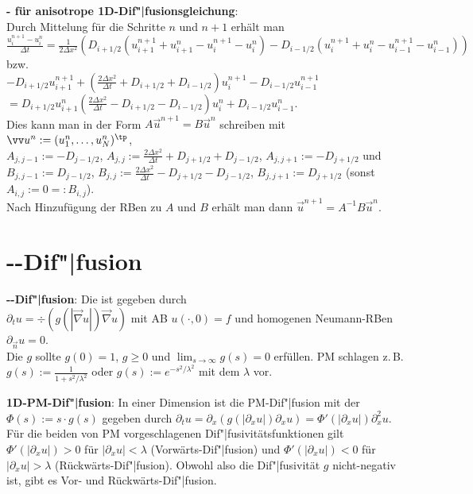 \textbf{- für anisotrope 1D-Dif"|fusionsgleichung}:\\
Durch Mittelung für die Schritte $n$ und $n + 1$ erhält man\\
$\frac{u_i^{n+1} - u_i^n}{\Delta t} =
\frac{1}{2\Delta x^2}  (D_{i+1/2} (u_{i+1}^{n+1} + u_{i+1}^n - u_i^{n+1} - u_i^n) -
D_{i-1/2} (u_i^{n+1} + u_i^n - u_{i-1}^{n+1} - u_{i-1}^n))$ bzw.\\
$-D_{i+1/2} u_{i+1}^{n+1} + (\frac{2\Delta x^2}{\Delta t} + D_{i+1/2} + D_{i-1/2}) u_i^{n+1} -
D_{i-1/2} u_{i-1}^{n+1}$\\
$= D_{i+1/2} u_{i+1}^n (\frac{2\Delta x^2}{\Delta t} - D_{i+1/2} - D_{i-1/2}) u_i^n +
D_{i-1/2} u_{i-1}^n$.\\
Dies kann man in der Form $A\vec{u}^{n+1} = B\vec{u}^n$ schreiben mit
$\vec{u}^n := (u_1^n, \dotsc, u_N^n)^\tp$,\\
$A_{j,j-1} := -D_{j-1/2}$,
$A_{j,j} := \frac{2\Delta x^2}{\Delta t} + D_{j+1/2} + D_{j-1/2}$,
$A_{j,j+1} := -D_{j+1/2}$ und\\
$B_{j,j-1} := D_{j-1/2}$,
$B_{j,j} := \frac{2\Delta x^2}{\Delta t} - D_{j+1/2} - D_{j-1/2}$,
$B_{j,j+1} := D_{j+1/2}$
(sonst $A_{i,j} := 0 =: B_{i,j}$).\\
Nach Hinzufügung der RBen zu $A$ und $B$ erhält man dann $\vec{u}^{n+1} = A^{-1} B\vec{u}^n$.

\pagebreak

\section{%
    --Dif"|fusion%
}

\textbf{--Dif"|fusion}:
Die  ist gegeben durch\\
$\partial_t u = \div(g(|\vec{\nabla} u|) \vec{\nabla} u)$
mit AB $u(\cdot, 0) = f$ und homogenen Neumann-RBen $\partial_{\vec{n}} u = 0$.\\
Die  $g$ sollte
$g(0) = 1$, $g \ge 0$ und $\lim_{s \to \infty} g(s) = 0$ erfüllen.
PM schlagen z.\,B. $g(s) := \frac{1}{1 + s^2/\lambda^2}$ oder $g(s) := e^{-s^2/\lambda^2}$ mit
dem  $\lambda$ vor.

\linie

\textbf{1D-PM-Dif"|fusion}:
In einer Dimension ist die PM-Dif"|fusion mit der \\
$\Phi(s) := s \cdot g(s)$ gegeben durch
$\partial_t u = \partial_x (g(|\partial_x u|) \partial_x u) =
\Phi'(|\partial_x u|) \partial_x^2 u$.
Für die beiden von PM vorgeschlagenen Dif"|fusivitätsfunktionen gilt
$\Phi'(|\partial_x u|) > 0$ für $|\partial_x u| < \lambda$ (Vorwärts-Dif"|fusion) und
$\Phi'(|\partial_x u|) < 0$ für $|\partial_x u| > \lambda$ (Rückwärts-Dif"|fusion).
Obwohl also die Dif"|fusivität $g$ nicht-negativ ist, gibt es Vor- und Rückwärts-Dif"|fusion.


